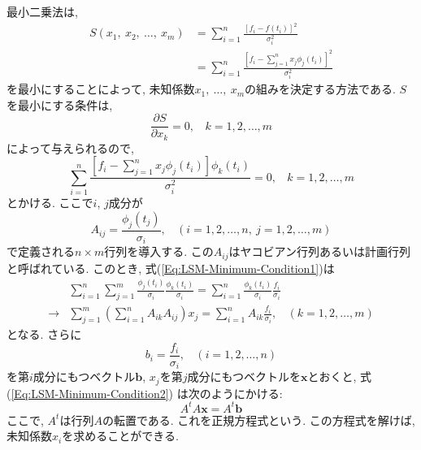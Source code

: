 最小二乗法は, 
\begin{align}
    S(x_{1},~ x_{2},~\ldots,~ x_{m})
    &=
    \sum_{i=1}^{n} \frac{[f_{i} - f(t_{i})]^{2}}{\sigma_{i}^{2}}
    \\ &=
    \sum_{i=1}^{n}
    \frac{[f_{i} - \sum_{j=1}^{n} x_{j} \phi_{j}(t_{i})]^{2}}
    {\sigma_{i}^{2}}
\end{align}
を最小にすることによって, 未知係数$x_{1},~\ldots,~x_{m}$の組みを決定する方法である. 
$S$を最小にする条件は, 
\begin{equation}
    \frac{\partial S}{\partial x_{k}} = 0,
    ~~~~
    k = 1,2,\ldots,m
\end{equation}
によって与えられるので, 
\begin{equation}
    \sum_{i=1}^{n}
    \frac{[f_{i} - \sum_{j=1}^{n} x_{j} \phi_{j}(t_{i})]\phi_{k}(t_{i})}
    {\sigma_{i}^{2}} = 0,
    ~~~~
    k = 1,2,\ldots,m
    \label{Eq:LSM-Minimum-Condition1}
\end{equation}
とかける. ここで$i$, $j$成分が
\begin{equation}
    A_{ij} = \frac{\phi_{j}(t_{j})}{\sigma_{i}},
    ~~~~
    (i = 1,2,\ldots,n,
    ~
    j = 1,2,\ldots,m)
\end{equation}
で定義される$n \times m$行列を導入する. 
この$A_{ij}$はヤコビアン行列あるいは計画行列と呼ばれている. 
このとき, 式(\ref{Eq:LSM-Minimum-Condition1})は
\begin{align}
    &
    \sum_{i=1}^{n} \sum_{j=1}^{m}
    \frac{\phi_{j}(t_{i})}{\sigma_{i}}
    \frac{\phi_{k}(t_{i})}{\sigma_{i}} =
    \sum_{i=1}^{n}
    \frac{\phi_{k}(t_{i})}{\sigma_{i}}
    \frac{f_{i}}{\sigma_{i}}
    \\
    \to &
    \sum_{j=1}^{m}
    \left(\sum_{i=1}^{n} A_{ik} A_{ij}\right) x_{j}
    =
    \sum_{i=1}^{n}
    A_{ik} \frac{f_{i}}{\sigma_{i}},
    ~~~~
    (k = 1,2,\ldots,m)
    \label{Eq:LSM-Minimum-Condition2}
\end{align}
となる. さらに
\begin{equation}
    b_{i} = \frac{f_{i}}{\sigma_{i}},
    ~~~~
    (i=1,2,\ldots,n)
\end{equation}
を第$i$成分にもつベクトル$\bm{b}$, 
$x_{j}$を第$j$成分にもつベクトルを$\bm{x}$とおくと, 式(\ref{Eq:LSM-Minimum-Condition2})
は次のようにかける:
\begin{equation}
    A^{t}A \bm{x} = A^{t} \bm{b}
\end{equation}
ここで, $A^{t}$は行列$A$の転置である. 
これを正規方程式という. 
この方程式を解けば, 未知係数$x_{i}$を求めることができる. 

